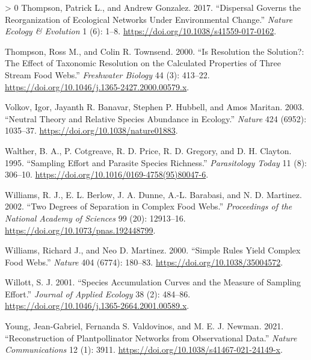 \documentclass[10pt,oneside]{article}
\newlength{\cslhangindent}
\newenvironment{CSLReferences}[3] %
 {%
  \setlength{\parindent}{0pt}
  \ifodd #1 \everypar{\setlength{\hangindent}{\cslhangindent}}\ignorespaces\fi
  \ifnum #2 > 0
  \setlength{\parskip}{#2\baselineskip}
  \fi
 }%
 {}
\begin{document}
\begin{CSLReferences}{1}{0}
\leavevmode\hypertarget{ref-Thompson2017DisGov}{}%
Thompson, Patrick L., and Andrew Gonzalez. 2017. {``Dispersal Governs
the Reorganization of Ecological Networks Under Environmental Change.''}
\emph{Nature Ecology \& Evolution} 1 (6): 1--8.
\url{https://doi.org/10.1038/s41559-017-0162}.

\leavevmode\hypertarget{ref-Thompson2000ResSol}{}%
Thompson, Ross M., and Colin R. Townsend. 2000. {``Is Resolution the
Solution?: The Effect of Taxonomic Resolution on the Calculated
Properties of Three Stream Food Webs.''} \emph{Freshwater Biology} 44
(3): 413--22. \url{https://doi.org/10.1046/j.1365-2427.2000.00579.x}.

\leavevmode\hypertarget{ref-Volkov2003NeuThe}{}%
Volkov, Igor, Jayanth R. Banavar, Stephen P. Hubbell, and Amos Maritan.
2003. {``Neutral Theory and Relative Species Abundance in Ecology.''}
\emph{Nature} 424 (6952): 1035--37.
\url{https://doi.org/10.1038/nature01883}.

\leavevmode\hypertarget{ref-Walther1995SamEff}{}%
Walther, B. A., P. Cotgreave, R. D. Price, R. D. Gregory, and D. H.
Clayton. 1995. {``Sampling Effort and Parasite Species Richness.''}
\emph{Parasitology Today} 11 (8): 306--10.
\url{https://doi.org/10.1016/0169-4758(95)80047-6}.

\leavevmode\hypertarget{ref-Williams2002TwoDeg}{}%
Williams, R. J., E. L. Berlow, J. A. Dunne, A.-L. Barabasi, and N. D.
Martinez. 2002. {``Two Degrees of Separation in Complex Food Webs.''}
\emph{Proceedings of the National Academy of Sciences} 99 (20):
12913--16. \url{https://doi.org/10.1073/pnas.192448799}.

\leavevmode\hypertarget{ref-Williams2000SimRul}{}%
Williams, Richard J., and Neo D. Martinez. 2000. {``Simple Rules Yield
Complex Food Webs.''} \emph{Nature} 404 (6774): 180--83.
\url{https://doi.org/10.1038/35004572}.

\leavevmode\hypertarget{ref-Willott2001SpeAcc}{}%
Willott, S. J. 2001. {``Species Accumulation Curves and the Measure of
Sampling Effort.''} \emph{Journal of Applied Ecology} 38 (2): 484--86.
\url{https://doi.org/10.1046/j.1365-2664.2001.00589.x}.

\leavevmode\hypertarget{ref-Young2021RecPla}{}%
Young, Jean-Gabriel, Fernanda S. Valdovinos, and M. E. J. Newman. 2021.
{``Reconstruction of Plantpollinator Networks from Observational
Data.''} \emph{Nature Communications} 12 (1): 3911.
\url{https://doi.org/10.1038/s41467-021-24149-x}.

\end{CSLReferences}
\end{document}

